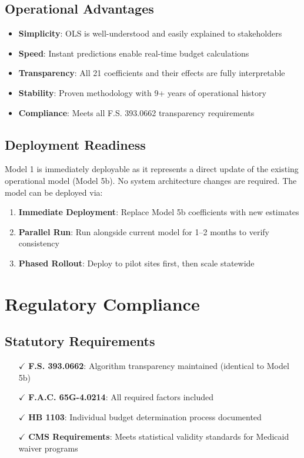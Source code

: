\subsection{Operational Advantages}

\begin{itemize}
    \item \textbf{Simplicity}: OLS is well-understood and easily explained to stakeholders
    \item \textbf{Speed}: Instant predictions enable real-time budget calculations
    \item \textbf{Transparency}: All 21 coefficients and their effects are fully interpretable
    \item \textbf{Stability}: Proven methodology with 9+ years of operational history
    \item \textbf{Compliance}: Meets all F.S. 393.0662 transparency requirements
\end{itemize}

\subsection{Deployment Readiness}

Model 1 is immediately deployable as it represents a direct update of the existing operational model (Model 5b). No system architecture changes are required. The model can be deployed via:

\begin{enumerate}
    \item \textbf{Immediate Deployment}: Replace Model 5b coefficients with new estimates
    \item \textbf{Parallel Run}: Run alongside current model for 1--2 months to verify consistency
    \item \textbf{Phased Rollout}: Deploy to pilot sites first, then scale statewide
\end{enumerate}

\section{Regulatory Compliance}

\subsection{Statutory Requirements}

\begin{itemize}
    \item[$\checkmark$] \textbf{F.S. 393.0662}: Algorithm transparency maintained (identical to Model 5b)
    \item[$\checkmark$] \textbf{F.A.C. 65G-4.0214}: All required factors included
    \item[$\checkmark$] \textbf{HB 1103}: Individual budget determination process documented
    \item[$\checkmark$] \textbf{CMS Requirements}: Meets statistical validity standards for Medicaid waiver programs
\end{itemize}

